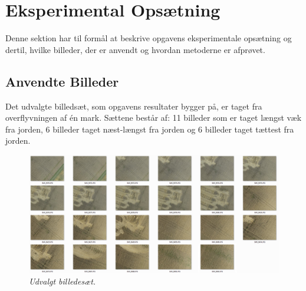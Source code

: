\chapter{Eksperimental Opsætning}
Denne sektion har til formål at beskrive opgavens eksperimentale opsætning og dertil, hvilke billeder, der er anvendt og hvordan metoderne er afprøvet.
\section{Anvendte Billeder}
Det udvalgte billedsæt, som opgavens resultater bygger på, er taget fra overflyvningen af én mark. Sættene består af: 11 billeder som er taget længst væk fra jorden, 6 billeder taget næst-længst fra jorden og 6 billeder taget tættest fra jorden.
\begin{figure}[H]
    \centering
    \includegraphics[width=1\textwidth]{fig/43a.png}
    \vspace{-0.5em}   
    \begin{center}
    \caption{{\footnotesize \textit{Udvalgt billedesæt.}}}
    \label{fig:lindblob}
     \end{center}
  \end{figure}
       \vspace{-2.7em}
\noindent
